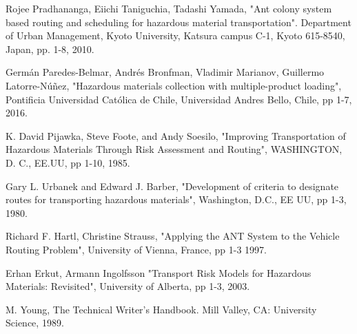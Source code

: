 \documentclass[conference]{IEEEtran}
\begin{document}
\begin{thebibliography}{00}
 Rojee Pradhananga, Eiichi Taniguchia, Tadashi Yamada, "Ant colony system based routing and scheduling for hazardous
material transportation". Department of Urban Management, Kyoto University, Katsura campus C-1, Kyoto 615-8540, Japan, pp. 1-8, 2010.

 Germ\'an Paredes-Belmar, Andr\'es Bronfman, Vladimir Marianov, Guillermo Latorre-N\'u\~nez, "Hazardous materials collection with multiple-product loading", Pontificia Universidad Cat\'olica de Chile, Universidad Andres Bello, Chile, pp 1-7, 2016.

 K. David Pijawka, Steve Foote, and Andy Soesilo, "Improving Transportation of Hazardous Materials Through Risk Assessment and Routing", WASHINGTON, D. C., EE.UU, pp 1-10, 1985.

 Gary L. Urbanek and Edward J. Barber, "Development of criteria to designate routes for transporting hazardous materials", Washington, D.C., EE UU, pp 1-3, 1980.


 Richard F. Hartl, Christine Strauss, "Applying the ANT System to the Vehicle Routing Problem", University of Vienna, France, pp 1-3 1997.

 Erhan Erkut, Armann Ingolfsson "Transport Risk Models for Hazardous Materials: Revisited", University of Alberta, pp 1-3, 2003.



 M. Young, The Technical Writer's Handbook. Mill Valley, CA: University Science, 1989.
\end{thebibliography}
\vspace{12pt}
\end{document}
